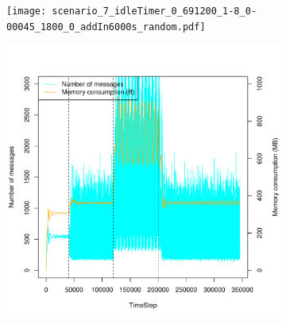\documentclass[a4j]{ujarticle}
\begin{document}
\clearpage

\begin{figure}[htbp]
 \centering
 \begin{subfigure}{0.49\hsize}
   \centering
   \texttt{[image: scenario\_7\_idleTimer\_0\_691200\_1-8\_0-00045\_1800\_0\_addIn6000s\_random.pdf]}
   \label{subfig:scenario_7_idleTimer_0_691200_1-8_0-00045_1800_0_addIn6000s_random}
 \end{subfigure}
 \par\bigskip %
 \begin{subfigure}{0.49\hsize}
   \centering
   \includegraphics[width=1.0\hsize]{scenario_7_signaling_and_memoryload_vs_timeStep_0_691200_1-8_0-00045_1800_0_addIn6000s_random.pdf}
   \label{subfig:scenario_7_signaling_and_memoryload_vs_timeStep_0_691200_1-8_0-00045_1800_0_addIn6000s_random}
 \end{subfigure}
 \begin{subfigure}{0.49\hsize}

\end{subfigure}
\end{figure}
\end{document}
